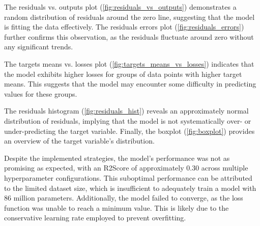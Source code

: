 The residuals vs. outputs plot (\ref{fig:residuals_vs_outputs}) demonstrates a random distribution of residuals around the zero line, suggesting that the model is fitting the data effectively. The residuals errors plot (\ref{fig:residuals_errors}) further confirms this observation, as the residuals fluctuate around zero without any significant trends.

The targets means vs. losses plot (\ref{fig:targets_means_vs_losses}) indicates that the model exhibits higher losses for groups of data points with higher target means. This suggests that the model may encounter some difficulty in predicting values for these groups.

The residuals histogram (\ref{fig:residuals_hist}) reveals an approximately normal distribution of residuals, implying that the model is not systematically over- or under-predicting the target variable. Finally, the boxplot (\ref{fig:boxplot}) provides an overview of the target variable's distribution.

Despite the implemented strategies, the model's performance was not as promising as expected, with an R2Score of approximately 0.30 across multiple hyperparameter configurations. This suboptimal performance can be attributed to the limited dataset size, which is insufficient to adequately train a model with 86 million parameters. Additionally, the model failed to converge, as the loss function was unable to reach a minimum value. This is likely due to the conservative learning rate employed to prevent overfitting.